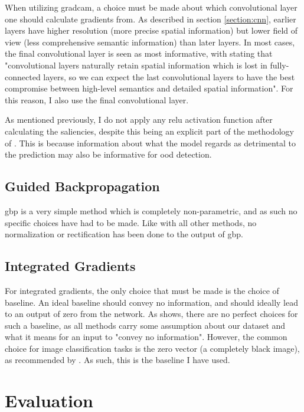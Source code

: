 \documentclass[UKenglish]{uiomasterthesis} %
\theoremstyle{definition}
\begin{document}
When utilizing \ac{gradcam}, a choice must be made about which convolutional layer one should calculate gradients from. As described in section \ref{section:cnn}, earlier layers have higher resolution (more precise spatial information) but lower field of view (less comprehensive semantic information) than later layers. In most cases, the final convolutional layer is seen as most informative, with \cite{gradcam} stating that "convolutional layers naturally retain spatial information which is lost in fully-connected layers, so we can expect the last convolutional layers to have the best compromise between high-level semantics and detailed spatial information". For this reason, I also use the final convolutional layer.

As mentioned previously, I do not apply any \ac{relu} activation function after calculating the saliencies, despite this being an explicit part of the methodology of \cite{gradcam}. This is because information about what the model regards as detrimental to the prediction may also be informative for \ac{ood} detection.

\subsection{Guided Backpropagation}

\ac{gbp} is a very simple method which is completely non-parametric, and as such no specific choices have had to be made. Like with all other methods, no normalization or rectification has been done to the output of \ac{gbp}.

\subsection{Integrated Gradients}

For integrated gradients, the only choice that must be made is the choice of baseline. An ideal baseline should convey no information, and should ideally lead to an output of zero from the network. As \cite{sturmfels2020visualizing} shows, there are no perfect choices for such a baseline, as all methods carry some assumption about our dataset and what it means for an input to "convey no information". However, the common choice for image classification tasks is the zero vector (a completely black image), as recommended by \cite{integratedgradients}. As such, this is the baseline I have used.

\section{Evaluation} \label{section:evaluation}
\end{document}
